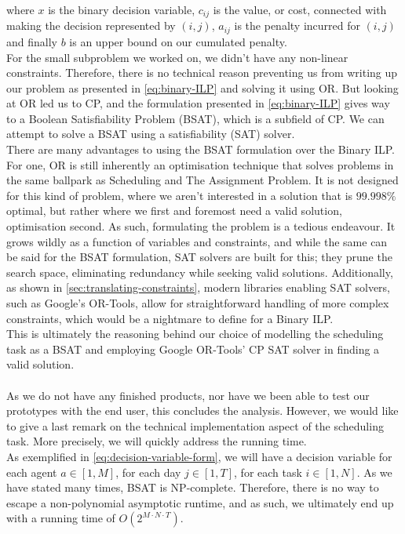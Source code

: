 where \(x\) is the binary decision variable, \(c_{ij}\) is the value, or cost, connected with making the decision represented by \( (i,j) \), \( a_{ij} \) is the penalty incurred for \( (i,j) \) and finally \(b\) is an upper bound on our cumulated penalty.
\\
For the small subproblem we worked on, we didn't have any non-linear constraints. Therefore, there is no technical reason preventing us from writing up our problem as presented in \autoref{eq:binary-ILP} and solving it using OR. But looking at OR led us to CP, and the formulation presented in \autoref{eq:binary-ILP} gives way to a Boolean Satisfiability Problem (BSAT), which is a subfield of CP. We can attempt to solve a BSAT using a satisfiability (SAT) solver.
\\
There are many advantages to using the BSAT formulation over the Binary ILP. For one, OR is still inherently an optimisation technique that solves problems in the same ballpark as Scheduling and The Assignment Problem. It is not designed for this kind of problem, where we aren't interested in a solution that is \(99.998\%\) optimal, but rather where we first and foremost need a valid solution, optimisation second. As such, formulating the problem is a tedious endeavour. It grows wildly as a function of variables and constraints, and while the same can be said for the BSAT formulation, SAT solvers are built for this; they prune the search space, eliminating redundancy while seeking valid solutions. Additionally, as shown in \autoref{sec:translating-constraints}, modern libraries enabling SAT solvers, such as Google's OR-Tools, allow for straightforward handling of more complex constraints, which would be a nightmare to define for a Binary ILP.
\\
This is ultimately the reasoning behind our choice of modelling the scheduling task as a BSAT and employing Google OR-Tools' CP SAT solver in finding a valid solution.
\\
\\
As we do not have any finished products, nor have we been able to test our prototypes with the end user, this concludes the analysis. However, we would like to give a last remark on the technical implementation aspect of the scheduling task. More precisely, we will quickly address the running time.
\\
As exemplified in \autoref{eq:decision-variable-form}, we will have a decision variable for each agent \(a \in [1, M]\), for each day \(j \in [1, T]\), for each task \(i \in [1, N]\). As we have stated many times, BSAT is NP-complete. Therefore, there is no way to escape a non-polynomial asymptotic runtime, and as such, we ultimately end up with a running time of \(O(2^{M \cdot N \cdot T})\).
